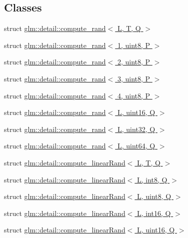 \subsection*{Classes}
\begin{DoxyCompactItemize}
\item 
struct \hyperlink{structglm_1_1detail_1_1compute__rand}{glm\+::detail\+::compute\+\_\+rand$<$ L, T, Q $>$}
\item 
struct \hyperlink{structglm_1_1detail_1_1compute__rand_3_011_00_01uint8_00_01P_01_4}{glm\+::detail\+::compute\+\_\+rand$<$ 1, uint8, P $>$}
\item 
struct \hyperlink{structglm_1_1detail_1_1compute__rand_3_012_00_01uint8_00_01P_01_4}{glm\+::detail\+::compute\+\_\+rand$<$ 2, uint8, P $>$}
\item 
struct \hyperlink{structglm_1_1detail_1_1compute__rand_3_013_00_01uint8_00_01P_01_4}{glm\+::detail\+::compute\+\_\+rand$<$ 3, uint8, P $>$}
\item 
struct \hyperlink{structglm_1_1detail_1_1compute__rand_3_014_00_01uint8_00_01P_01_4}{glm\+::detail\+::compute\+\_\+rand$<$ 4, uint8, P $>$}
\item 
struct \hyperlink{structglm_1_1detail_1_1compute__rand_3_01L_00_01uint16_00_01Q_01_4}{glm\+::detail\+::compute\+\_\+rand$<$ L, uint16, Q $>$}
\item 
struct \hyperlink{structglm_1_1detail_1_1compute__rand_3_01L_00_01uint32_00_01Q_01_4}{glm\+::detail\+::compute\+\_\+rand$<$ L, uint32, Q $>$}
\item 
struct \hyperlink{structglm_1_1detail_1_1compute__rand_3_01L_00_01uint64_00_01Q_01_4}{glm\+::detail\+::compute\+\_\+rand$<$ L, uint64, Q $>$}
\item 
struct \hyperlink{structglm_1_1detail_1_1compute__linearRand}{glm\+::detail\+::compute\+\_\+linear\+Rand$<$ L, T, Q $>$}
\item 
struct \hyperlink{structglm_1_1detail_1_1compute__linearRand_3_01L_00_01int8_00_01Q_01_4}{glm\+::detail\+::compute\+\_\+linear\+Rand$<$ L, int8, Q $>$}
\item 
struct \hyperlink{structglm_1_1detail_1_1compute__linearRand_3_01L_00_01uint8_00_01Q_01_4}{glm\+::detail\+::compute\+\_\+linear\+Rand$<$ L, uint8, Q $>$}
\item 
struct \hyperlink{structglm_1_1detail_1_1compute__linearRand_3_01L_00_01int16_00_01Q_01_4}{glm\+::detail\+::compute\+\_\+linear\+Rand$<$ L, int16, Q $>$}
\item 
struct \hyperlink{structglm_1_1detail_1_1compute__linearRand_3_01L_00_01uint16_00_01Q_01_4}{glm\+::detail\+::compute\+\_\+linear\+Rand$<$ L, uint16, Q $>$}

\end{DoxyCompactItemize}

